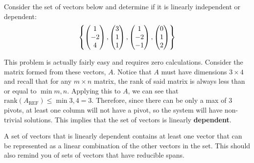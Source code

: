 \begin{example}{}{}
    Consider the set of vectors below and determine if it is linearly independent or dependent:
    \[ 
        \left\{
            \begin{pmatrix}
                1 \\ -2 \\ 4
            \end{pmatrix}, 
            \begin{pmatrix}
                3 \\ 1 \\ 1
            \end{pmatrix},
            \begin{pmatrix}
                1 \\ -2 \\ -1
            \end{pmatrix}, 
            \begin{pmatrix}
                0 \\ 1 \\ 2
            \end{pmatrix}
         \right\}
    \]
    \begin{solution}
        This problem is actually fairly easy and requires zero calculations. Consider the matrix formed from these vectors, $A$. Notice that $A$ must have dimensions $3 \times 4$ and recall that for any $m \times n$ matrix, the rank of said matrix is always less than or equal to $\min{m, n}$. Applying this to $A$, we can see that $\text{rank}\left(A_{\text{REF}}\right) \leq \min{3, 4} = 3$. Therefore, since there can be only a max of $3$ pivots, at least one column will not have a pivot, so the system will have non-trivial solutions. This implies that the set of vectors is linearly \textbf{dependent}. 
    \end{solution}
\end{example}

A set of vectors that is linearly dependent contains at least one vector that can be represented as a linear combination of the other vectors in the set. This should also remind you of sets of vectors that have reducible spans.

